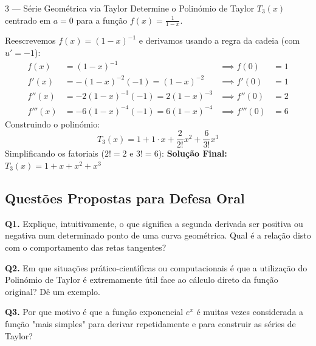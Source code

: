 \begin{exercisebox}{3 --- Série Geométrica via Taylor}
  Determine o Polinómio de Taylor $T_3(x)$ centrado em $a=0$ para a função $f(x)=\frac{1}{1-x}$.
\end{exercisebox}
\begin{solbox}
  Reescrevemos $f(x) = (1-x)^{-1}$ e derivamos usando a regra da cadeia (com $u' = -1$):
  \begin{align*}
      f(x) &= (1-x)^{-1} & \implies f(0) &= 1 \\
      f'(x) &= -(1-x)^{-2}(-1) = (1-x)^{-2} & \implies f'(0) &= 1 \\
      f''(x) &= -2(1-x)^{-3}(-1) = 2(1-x)^{-3} & \implies f''(0) &= 2 \\
      f'''(x) &= -6(1-x)^{-4}(-1) = 6(1-x)^{-4} & \implies f'''(0) &= 6
  \end{align*}
  Construindo o polinómio:
  \[
    T_3(x) = 1 + 1\cdot x + \frac{2}{2!}x^2 + \frac{6}{3!}x^3
  \]
  Simplificando os fatoriais ($2!=2$ e $3!=6$):
  \textbf{Solução Final:} $\boxed{T_3(x) = 1 + x + x^2 + x^3}$
\end{solbox}

\subsection{Questões Propostas para Defesa Oral}

\begin{oralbox}
  \textbf{Q1.} Explique, intuitivamente, o que significa a segunda derivada ser positiva ou negativa num determinado ponto de uma curva geométrica. Qual é a relação disto com o comportamento das retas tangentes?
\end{oralbox}

\begin{oralbox}
  \textbf{Q2.} Em que situações prático-científicas ou computacionais é que a utilização do Polinómio de Taylor é extremamente útil face ao cálculo direto da função original? Dê um exemplo.
\end{oralbox}

\begin{oralbox}
  \textbf{Q3.} Por que motivo é que a função exponencial $e^x$ é muitas vezes considerada a função "mais simples" para derivar repetidamente e para construir as séries de Taylor?
\end{oralbox}